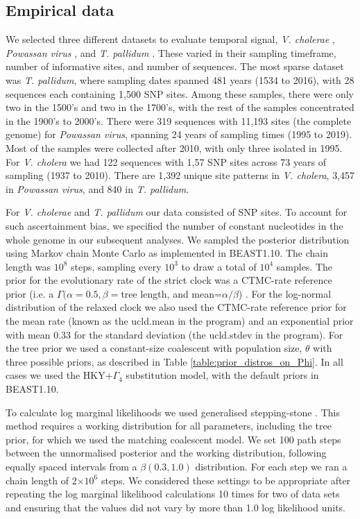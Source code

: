 \documentclass[10pt,letterpaper]{article}
\begin{document}
\subsection*{Empirical data}
We selected three different datasets to evaluate temporal signal, \textit{V. cholerae} \cite{devault2014second}, \textit{Powassan virus} \cite{vogels2023phylogeographic}, and \textit{T. pallidum} \cite{majander2020ancient}. These varied in their sampling timeframe, number of informative sites, and number of sequences. The most sparse dataset was \textit{T. pallidum}, where sampling dates spanned 481 years (1534 to 2016), with 28 sequences each containing 1,500 SNP sites. Among these samples, there were only two in the 1500's and two in the 1700's, with the rest of the samples concentrated in the 1900's to 2000's. There were 319 sequences with 11,193 sites (the complete genome) for \textit{Powassan virus}, spanning 24 years of sampling times (1995 to 2019). Most of the samples were collected after 2010, with only three isolated in 1995. For \textit{V. cholera} we had 122  sequences with 1,57 SNP sites across 73 years of sampling (1937 to 2010). There are 1,392 unique site patterns in \textit{V. cholera}, 3,457 in \textit{Powassan virus}, and 840 in \textit{T. pallidum}. 

For \textit{V. cholerae} and \textit{T. pallidum} our data consisted of SNP sites. To account for such ascertainment bias, we specified the number of constant nucleotides in the whole genome in our subsequent analyses. We sampled the posterior distribution using Markov chain Monte Carlo as implemented in BEAST1.10. The chain length was $10^8$ steps, sampling every $10^3$ to draw a total of $10^4$ samples. The prior for the evolutionary rate of the strict clock was a CTMC-rate reference prior (i.e. a $\Gamma(\alpha=0.5, \beta=$tree length, and mean=$\alpha/\beta$) \cite{ferreira2008bayesian}. For the log-normal distribution of the relaxed clock we also used the CTMC-rate reference prior for the mean rate (known as the ucld.mean in the program) and an exponential prior with mean 0.33 for the standard deviation (the ucld.stdev in the program). For the tree prior we used a constant-size coalescent with population size, $\theta$ with three possible priors, as described in Table \ref{table:prior_distros_on_Phi}. In all cases we used the HKY+$\Gamma_4$ substitution model, with the default priors in BEAST1.10.

To calculate log marginal likelihoods we used generalised stepping-stone \cite{baele2016genealogical,fan2011choosing}. This method requires a working distribution for all parameters, including the tree prior, for which we used the matching coalescent model. We set 100 path steps between the unnormalised posterior and the working distribution, following equally spaced intervals from a $\beta(0.3, 1.0)$ distribution. For each step we ran a chain length of 2$\times 10^{6}$ steps. We considered these settings to be appropriate after repeating the log marginal likelihood calculations 10 times for two of data sets and ensuring that the values did not vary by more than 1.0 log likelihood units.
\end{document}
